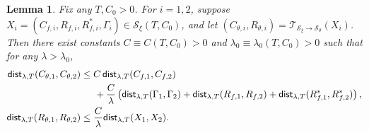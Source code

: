 \documentclass[11pt,letterpaper,reqno]{amsart}
\newtheorem{lem}[thm]{Lemma}
\theoremstyle{definition}
\def\trsfrmA{\mathcal{T}_{\mathcal{S}_\xi \to {\mathcal{S}}_\theta}}
\newcommand{\lbddst}[2]{\mathsf{dist}_{\lambda,T}(#1,#2)}
\newcommand{\prn}[1]{\left({#1}\right)} %
\begin{document}
\begin{lem}\label{lem:contract-Ct}
Fix any $T,C_0>0$. For $i=1,2$, 
suppose $X_i=(C_{f,i},R_{f,i},R_{f,i}^*,\Gamma_i) \in \mathcal{S}_\xi(T,C_0)$,
and let $(C_{\theta,i},R_{\theta,i})=\trsfrmA(X_i)$.
Then there exist constants $C \equiv C(T,C_0)>0$ and $\lambda_0 \equiv
\lambda_0(T,C_0)>0$ such that for any $\lambda>\lambda_0$,
\begin{align}
\lbddst{C_{\theta,1}}{C_{\theta,2}} & \leq C\,\lbddst
{C_{f,1}}{C_{f,2}}\notag\\
&\hspace{0.2in}+\frac{C}{\lambda}\prn{\lbddst{\Gamma_1} {\Gamma_2} +
\lbddst{R_{f,1}}{R_{f,2}} + \lbddst{R_{f,1}^*}{R_{f,2}^*}},
\label{eq:contractCtheta}\\
    \lbddst{R_{\theta,1}}{R_{\theta,2}} &\leq
\frac{C}{\lambda}\lbddst{X_1}{X_2}.\label{eq:contractRtheta}
\end{align}
\end{lem}
\end{document}
